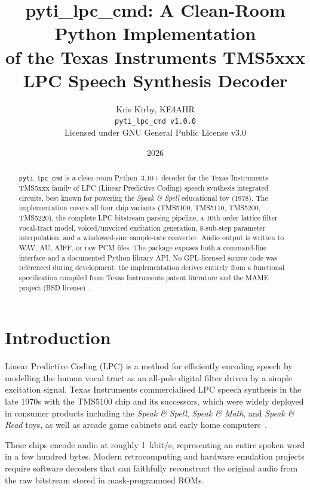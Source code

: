 \documentclass[10pt]{article}
\title{\textbf{pyti\_lpc\_cmd}: A Clean-Room Python Implementation\\
       of the Texas Instruments TMS5xxx\\
       LPC Speech Synthesis Decoder}
\author{Kris Kirby, KE4AHR\\
        \small\texttt{pyti\_lpc\_cmd v1.0.0}\\
        \small Licensed under GNU General Public License v3.0}
\date{2026}
\begin{document}
\maketitle
\thispagestyle{fancy}

\begin{abstract}
\noindent
\texttt{pyti\_lpc\_cmd} is a clean-room Python~3.10+ decoder for the
Texas Instruments TMS5xxx family of LPC (Linear Predictive Coding) speech
synthesis integrated circuits, best known for powering the \emph{Speak \&
Spell} educational toy (1978).  The implementation covers all four chip
variants (TMS5100, TMS5110, TMS5200, TMS5220), the complete LPC bitstream
parsing pipeline, a 10th-order lattice filter vocal-tract model,
voiced/unvoiced excitation generation, 8-sub-step parameter interpolation,
and a windowed-sinc sample-rate converter.  Audio output is written to WAV,
AU, AIFF, or raw PCM files.  The package exposes both a command-line
interface and a documented Python library API.  No GPL-licensed source code
was referenced during development; the implementation derives entirely from a
functional specification compiled from Texas Instruments patent literature and
the MAME project (BSD license)~\cite{MAME}.
\end{abstract}

\tableofcontents
\bigskip

\section{Introduction}
\label{sec:intro}

Linear Predictive Coding (LPC) is a method for efficiently encoding speech by
modelling the human vocal tract as an all-pole digital filter driven by a
simple excitation signal.  Texas Instruments commercialised LPC speech
synthesis in the late 1970s with the TMS5100 chip and its successors, which
were widely deployed in consumer products including the \emph{Speak \& Spell},
\emph{Speak \& Math}, and \emph{Speak \& Read} toys, as well as arcade game
cabinets and early home computers~\cite{Wiggins1978}.

These chips encode audio at roughly 1~kbit/s, representing an entire
spoken word in a few hundred bytes.  Modern retrocomputing and hardware
emulation projects require software decoders that can faithfully reconstruct
the original audio from the raw bitstream stored in mask-programmed ROMs.
\end{document}
